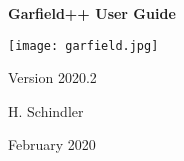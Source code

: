 \begin{titlepage}
  {
  \centering
  \sffamily
  \linespread{1.5}

  \vspace{3cm} 

  \huge{\textbf{Garfield++ User Guide}}

  \vspace{2cm}

  \texttt{[image: garfield.jpg]}

  \vspace{2cm}

  \large
  Version 2020.2 

  \vspace{2cm}
  \large
  H. Schindler

  \vfill

  February 2020

  }
\end{titlepage}

